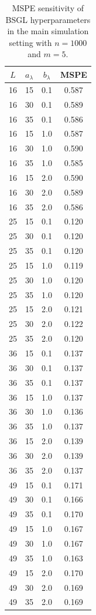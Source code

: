 \begin{table}[!t]
\centering
\caption{MSPE sensitivity of BSGL hyperparameters in the main simulation setting with $n=1000$ and $m=5$.}
\label{tab:bsgl_hyperparameter_mspe}
\begin{tabular}{cccc}
\toprule
$L$ & $a_\lambda$ & $b_\lambda$ & MSPE \\
\midrule
16 & 15 & 0.1 & 0.587 \\
16 & 30 & 0.1 & 0.589 \\
16 & 35 & 0.1 & 0.586 \\
16 & 15 & 1.0 & 0.587 \\
16 & 30 & 1.0 & 0.590 \\
16 & 35 & 1.0 & 0.585 \\
16 & 15 & 2.0 & 0.590 \\
16 & 30 & 2.0 & 0.589 \\
16 & 35 & 2.0 & 0.586 \\
\midrule
25 & 15 & 0.1 & 0.120 \\
25 & 30 & 0.1 & 0.120 \\
25 & 35 & 0.1 & 0.120 \\
25 & 15 & 1.0 & 0.119 \\
25 & 30 & 1.0 & 0.120 \\
25 & 35 & 1.0 & 0.120 \\
25 & 15 & 2.0 & 0.121 \\
25 & 30 & 2.0 & 0.122 \\
25 & 35 & 2.0 & 0.120 \\
\midrule
36 & 15 & 0.1 & 0.137 \\
36 & 30 & 0.1 & 0.137 \\
36 & 35 & 0.1 & 0.137 \\
36 & 15 & 1.0 & 0.137 \\
36 & 30 & 1.0 & 0.136 \\
36 & 35 & 1.0 & 0.137 \\
36 & 15 & 2.0 & 0.139 \\
36 & 30 & 2.0 & 0.139 \\
36 & 35 & 2.0 & 0.137 \\
\midrule
49 & 15 & 0.1 & 0.171 \\
49 & 30 & 0.1 & 0.166 \\
49 & 35 & 0.1 & 0.170 \\
49 & 15 & 1.0 & 0.167 \\
49 & 30 & 1.0 & 0.167 \\
49 & 35 & 1.0 & 0.163 \\
49 & 15 & 2.0 & 0.170 \\
49 & 30 & 2.0 & 0.169 \\
49 & 35 & 2.0 & 0.169 \\
\bottomrule
\end{tabular}
\end{table}
